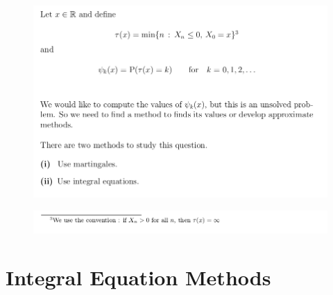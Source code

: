 \documentclass[c, dvipsnames, 8pt]{beamer}
\begin{document}
\begin{frame}[shrink=5]
	\frametitle{\insertsection} 
	
	
	\frametitle{\insertsection} 
\begin{figure}
	\centering
	\includegraphics[width=1\linewidth]{screenshot033}
	\label{fig:screenshot001}
\end{figure}

\begin{figure}
	\centering
	\includegraphics[width=1\linewidth]{screenshot034}
	\label{fig:screenshot001}
\end{figure}




\end{frame}


\section{Integral Equation Methods}
\end{document}
